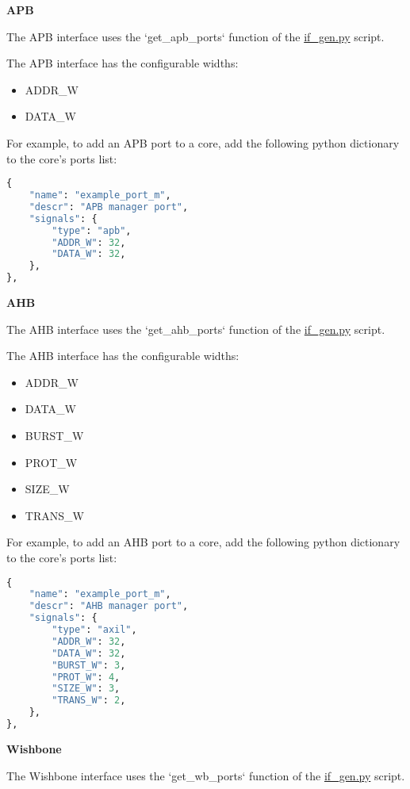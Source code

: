 %
%
\clearpage
\large\textbf{APB}

The APB interface uses the `get\_apb\_ports` function of the \href{https://github.com/IObundle/py2hwsw/blob/main/py2hwsw/scripts/if_gen.py}{if\_gen.py} script.


The APB interface has the configurable widths:
\begin{itemize}
  \item ADDR\_W
  \item DATA\_W
\end{itemize}

For example, to add an APB port to a core, add the following python dictionary to the core's ports list:
\begin{lstlisting}[language=python]
{
	"name": "example_port_m",
	"descr": "APB manager port",
	"signals": {
		"type": "apb",
		"ADDR_W": 32,
		"DATA_W": 32,
	},
},
\end{lstlisting}


%
%
\clearpage
\large\textbf{AHB}

The AHB interface uses the `get\_ahb\_ports` function of the \href{https://github.com/IObundle/py2hwsw/blob/main/py2hwsw/scripts/if_gen.py}{if\_gen.py} script.


The AHB interface has the configurable widths:
\begin{itemize}
  \item ADDR\_W
  \item DATA\_W
  \item BURST\_W
  \item PROT\_W
  \item SIZE\_W
  \item TRANS\_W
\end{itemize}

For example, to add an AHB port to a core, add the following python dictionary to the core's ports list:
\begin{lstlisting}[language=python]
{
	"name": "example_port_m",
	"descr": "AHB manager port",
	"signals": {
		"type": "axil",
		"ADDR_W": 32,
		"DATA_W": 32,
		"BURST_W": 3,
		"PROT_W": 4,
		"SIZE_W": 3,
		"TRANS_W": 2,
	},
},
\end{lstlisting}


%
%
\clearpage
\large\textbf{Wishbone}

The Wishbone interface uses the `get\_wb\_ports` function of the \href{https://github.com/IObundle/py2hwsw/blob/main/py2hwsw/scripts/if_gen.py}{if\_gen.py} script.

